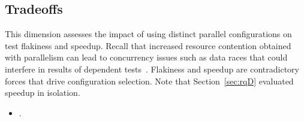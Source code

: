 \subsection{Tradeoffs}
\label{sec:rq6-tradeoffs}


This dimension assesses the impact of using distinct parallel
configurations on test flakiness and speedup.  Recall that increased
resource contention obtained with parallelism can lead to concurrency
issues such as data races that could interfere in results of dependent
tests~\cite{luo-etal-fse2014,bell-etal-esecfse2015}.  Flakiness and
speedup are contradictory forces that drive configuration selection.
Note that Section~\ref{sec:rqD} evaluated speedup in isolation.

\begin{itemize}
    \item \numRQIssuesOne{}. \textbf{\RQIssuesOne{}}
\end{itemize}



\newcommand{\subcolA}{$\text{speedup}$}
\newcommand{\subcolB}{$\%_\text{fail}$}
\newcommand{\colheader}[1]{\multicolumn{2}{c}{\emph{#1}}}
\newcommand{\blankentry}{\entry{-}{-}}
\newcommand{\subcol}{\subcolA{} & \subcolB{}}
\newcommand{\entry}[2]{#1 & #2}

